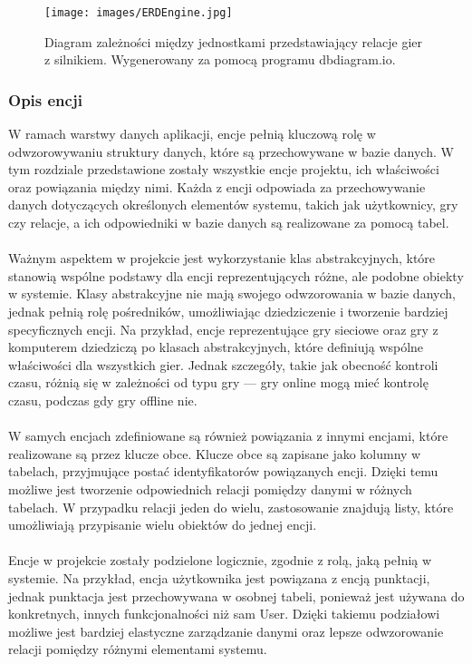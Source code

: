 \documentclass[twoside]{projektInzynierskiMS1}
\begin{document}
\vspace{0.5cm}
\begin{figure}[h!]
    \centering
    \texttt{[image: images/ERDEngine.jpg]}
    \caption{Diagram zależności między jednostkami przedstawiający relacje gier z silnikiem. Wygenerowany za pomocą programu dbdiagram.io.}
\end{figure}

\newpage

\subsubsection{Opis encji}

\noindent
W ramach warstwy danych aplikacji, encje pełnią kluczową rolę w odwzorowywaniu struktury danych, które są przechowywane w bazie danych. W tym rozdziale przedstawione zostały wszystkie encje projektu, ich właściwości oraz powiązania między nimi. Każda z encji odpowiada za przechowywanie danych dotyczących określonych elementów systemu, takich jak użytkownicy, gry czy relacje, a ich odpowiedniki w bazie danych są realizowane za pomocą tabel.
\\\\
Ważnym aspektem w projekcie jest wykorzystanie klas abstrakcyjnych, które stanowią wspólne podstawy dla encji reprezentujących różne, ale podobne obiekty w systemie. Klasy abstrakcyjne nie mają swojego odwzorowania w bazie danych, jednak pełnią rolę pośredników, umożliwiając dziedziczenie i tworzenie bardziej specyficznych encji. Na przykład, encje reprezentujące gry sieciowe oraz gry z komputerem dziedziczą po klasach abstrakcyjnych, które definiują wspólne właściwości dla wszystkich gier. Jednak szczegóły, takie jak obecność kontroli czasu, różnią się w zależności od typu gry — gry online mogą mieć kontrolę czasu, podczas gdy gry offline nie.
\\\\
W samych encjach zdefiniowane są również powiązania z innymi encjami, które realizowane są przez klucze obce. Klucze obce są zapisane jako kolumny w tabelach, przyjmujące postać identyfikatorów powiązanych encji. Dzięki temu możliwe jest tworzenie odpowiednich relacji pomiędzy danymi w różnych tabelach. W przypadku relacji jeden do wielu, zastosowanie znajdują listy, które umożliwiają przypisanie wielu obiektów do jednej encji.
\\\\
Encje w projekcie zostały podzielone logicznie, zgodnie z rolą, jaką pełnią w systemie. Na przykład, encja użytkownika jest powiązana z encją punktacji, jednak punktacja jest przechowywana w osobnej tabeli, ponieważ jest używana do konkretnych, innych funkcjonalności niż sam User. Dzięki takiemu podziałowi możliwe jest bardziej elastyczne zarządzanie danymi oraz lepsze odwzorowanie relacji pomiędzy różnymi elementami systemu.
\end{document}
